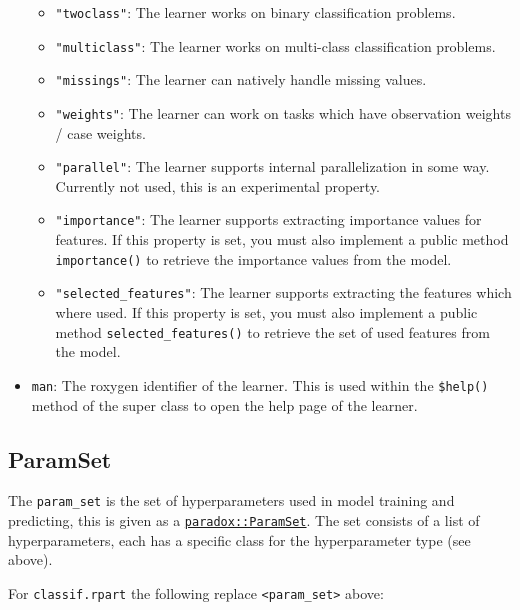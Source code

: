 \documentclass[
]{scrbook}
\providecommand{\tightlist}{%
  \setlength{\itemsep}{0pt}\setlength{\parskip}{0pt}}
\begin{document}
\begin{itemize}
  \begin{itemize}
  \tightlist
  \item
    \texttt{"twoclass"}: The learner works on binary classification problems.
  \item
    \texttt{"multiclass"}: The learner works on multi-class classification problems.
  \item
    \texttt{"missings"}: The learner can natively handle missing values.
  \item
    \texttt{"weights"}: The learner can work on tasks which have observation weights / case weights.
  \item
    \texttt{"parallel"}: The learner supports internal parallelization in some way.
    Currently not used, this is an experimental property.
  \item
    \texttt{"importance"}: The learner supports extracting importance values for features.
    If this property is set, you must also implement a public method \texttt{importance()} to retrieve the importance values from the model.
  \item
    \texttt{"selected\_features"}: The learner supports extracting the features which where used.
    If this property is set, you must also implement a public method \texttt{selected\_features()} to retrieve the set of used features from the model.
  \end{itemize}
\item
  \texttt{man}: The roxygen identifier of the learner.
  This is used within the \texttt{\$help()} method of the super class to open the help page of the learner.
\end{itemize}

\hypertarget{param-set}{%
\subsection{ParamSet}\label{param-set}}

The \texttt{param\_set} is the set of hyperparameters used in model training and predicting, this is given as a \href{https://paradox.mlr-org.com/reference/ParamSet.html}{\texttt{paradox::ParamSet}}. The set consists of a list of hyperparameters, each has a specific class for the hyperparameter type (see above).

For \texttt{classif.rpart} the following replace \texttt{\textless{}param\_set\textgreater{}} above:
\end{document}
